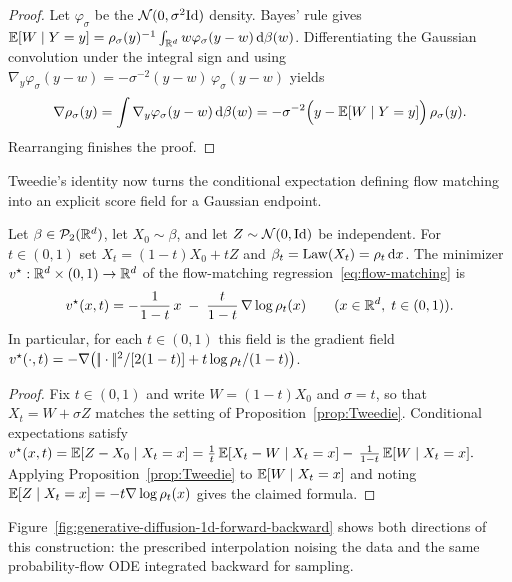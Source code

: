 \begin{proof}
Let $\varphi_\sigma$ be the $\mathcal{N}(0,\sigma^{2}\mathrm{Id})$ density. Bayes' rule gives \(\mathbb{E}[W\mid Y=y]=\rho_\sigma(y)^{-1}\int_{\mathbb{R}^{d}} w\varphi_\sigma(y-w)\,\mathrm{d}\beta(w)\).
Differentiating the Gaussian convolution under the integral sign and using
$
\nabla_y\varphi_\sigma(y-w)
     = -\sigma^{-2}(y-w)\,\varphi_\sigma(y-w)
$
yields
\[
\nabla\rho_\sigma(y)
= \int \nabla_y\varphi_\sigma(y-w)\,\mathrm{d}\beta(w)
= -\sigma^{-2}\Bigl(y-\mathbb{E}[W\mid Y=y]\Bigr)\,\rho_\sigma(y).
\]
Rearranging finishes the proof.
\end{proof}


Tweedie's identity now turns the conditional expectation defining flow matching into an explicit score field for a Gaussian endpoint.

\begin{proposition}\label{prop:flow}
Let \(\beta\in\mathcal{P}_2(\mathbb{R}^d)\), let $X_0\sim\beta$, and let $Z\sim\mathcal{N}(0,\mathrm{Id})$ be independent.
For $t\in(0,1)$ set \(X_t=(1-t)X_0+tZ\) and \(\beta_t=\operatorname{Law}(X_t)=\rho_t\,\mathrm{d} x\). The minimizer $v^\star:\mathbb{R}^d\times(0,1)\to\mathbb{R}^d$ of the flow-matching regression~\eqref{eq:flow-matching} is
\[
v^\star(x,t)
= -\frac{1}{1-t}\,x \;-\; \frac{t}{1-t}\,\nabla\log\rho_t(x)
\qquad (x\in\mathbb{R}^{d},\;t\in(0,1)).
\]
In particular, for each $t\in(0,1)$ this field is the gradient field \(v^\star(\cdot,t)=-\nabla\bigl(|\!| \cdot |\!|^2/[2(1-t)]+t\log\rho_t/(1-t)\bigr)\).
\end{proposition}

\begin{proof}
Fix $t\in(0,1)$ and write $W=(1-t)X_0$ and $\sigma=t$, so that
$X_t=W+\sigma Z$ matches the setting of Proposition~\ref{prop:Tweedie}.
Conditional expectations satisfy
$
v^\star(x,t)
= \mathbb{E}[Z-X_0\mid X_t=x]
= \frac{1}{t}\,\mathbb{E}[X_t-W\mid X_t=x]
  -\,\frac{1}{1-t}\,\mathbb{E}[W\mid X_t=x].
$
Applying Proposition~\ref{prop:Tweedie} to $\mathbb{E}[W\mid X_t=x]$ and
noting $\mathbb{E}[Z\mid X_t=x]=-t\nabla\log\rho_t(x)$
gives the claimed formula.
\end{proof}

Figure~\ref{fig:generative-diffusion-1d-forward-backward} shows both directions of this construction: the prescribed interpolation noising the data and the same probability-flow ODE integrated backward for sampling.

